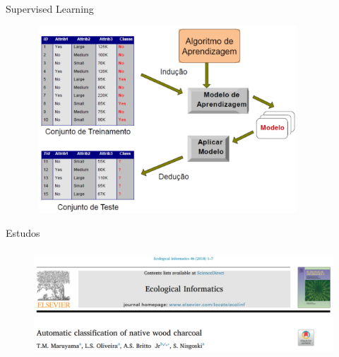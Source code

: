 \documentclass[12pt,ignorenonframetext,aspectratio=1610]{beamer}
\begin{document}
\begin{frame}[t]{Supervised Learning}
	
	\begin{figure}[H]
		\centering
		\includegraphics[width=10cm, height=7cm]{Fig/class.png}
	\end{figure}
	
\end{frame}


\begin{frame}[t]{Estudos}
	
	\begin{figure}[H]
		\centering
		
		\includegraphics[width=14cm, height=4cm]{Fig/pub3.png}
	\end{figure}
	
\end{frame}
\end{document}
